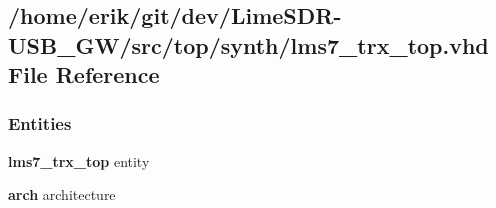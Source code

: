 \subsection{/home/erik/git/dev/\+Lime\+S\+D\+R-\/\+U\+S\+B\+\_\+\+G\+W/src/top/synth/lms7\+\_\+trx\+\_\+top.vhd File Reference}
\label{lms7__trx__top_8vhd}
\subsubsection*{Entities}
\begin{DoxyCompactItemize}
\item 
{\bf lms7\+\_\+trx\+\_\+top} entity
\item 
{\bf arch} architecture
\end{DoxyCompactItemize}
